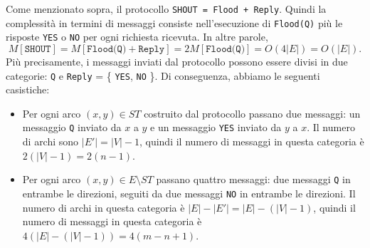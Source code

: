 Come menzionato sopra, il protocollo \texttt{SHOUT = Flood + Reply}. Quindi la complessità in termini di messaggi consiste nell'esecuzione di \texttt{Flood(Q)} più le risposte \texttt{YES} o \texttt{NO} per ogni richiesta ricevuta. In altre parole,
\[
    M[\texttt{SHOUT}] = M[\texttt{Flood(Q)} + \texttt{Reply}] = 2M[\texttt{Flood(Q)}] = O(4|E|) = O(|E|).
\]
Più precisamente, i messaggi inviati dal protocollo possono essere divisi in due categorie: \texttt{Q} e \texttt{Reply} = \{ \texttt{YES}, \texttt{NO} \}. Di conseguenza, abbiamo le seguenti casistiche:
\begin{itemize}
    \item Per ogni arco $(x, y) \in ST$ costruito dal protocollo passano due messaggi: un messaggio \texttt{Q} inviato da $x$ a $y$ e un messaggio \texttt{YES} inviato da $y$ a $x$. Il numero di archi sono $|E'| = |V| - 1$, quindi il numero di messaggi in questa categoria è $2(|V| - 1) = 2(n - 1)$.
    \begin{center}
    \end{center}
    \item Per ogni arco $(x, y) \in E \setminus ST$ passano quattro messaggi: due messaggi \texttt{Q} in entrambe le direzioni, seguiti da due messaggi \texttt{NO} in entrambe le direzioni. Il numero di archi in questa categoria è $|E| - |E'| = |E| - (|V| - 1)$, quindi il numero di messaggi in questa categoria è $4(|E| - (|V| - 1)) = 4(m - n + 1)$.
    \begin{center}
\end{center}
\end{itemize}
